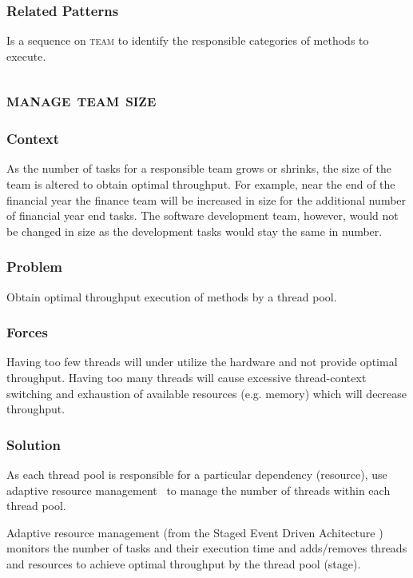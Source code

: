 \documentclass[prodmode]{style/acmlarge}
\begin{document}
\subsubsection*{Related Patterns} Is a sequence on \textsc{team} to identify
the responsible categories of methods to execute.



\subsection{\textsc{\textbf{manage team size}}}

\subsubsection*{Context} As the number of tasks for a responsible team grows or
shrinks, the size of the team is altered to obtain optimal throughput.  For example,
near the end of the financial year the finance team will be increased in size for
the additional number of financial year end tasks.  The software development
team, however, would not be changed in size as the development tasks would stay
the same in number.

\subsubsection*{Problem} Obtain optimal throughput execution of methods by a
thread pool.

\subsubsection*{Forces} Having too few threads will under utilize the hardware
and not provide optimal throughput.  Having too many threads will cause
excessive thread-context switching and exhaustion of available resources (e.g.
memory) which will decrease throughput.

\subsubsection*{Solution} As each thread pool is responsible for a particular
dependency (resource), use adaptive resource management~\cite{seda} to manage
the number of threads within each thread pool.

Adaptive resource management (from the Staged Event Driven Achitecture
\cite{seda}) monitors the number of tasks and their execution time and
adds/removes threads and resources to achieve optimal throughput by the thread
pool (stage).
\end{document}
